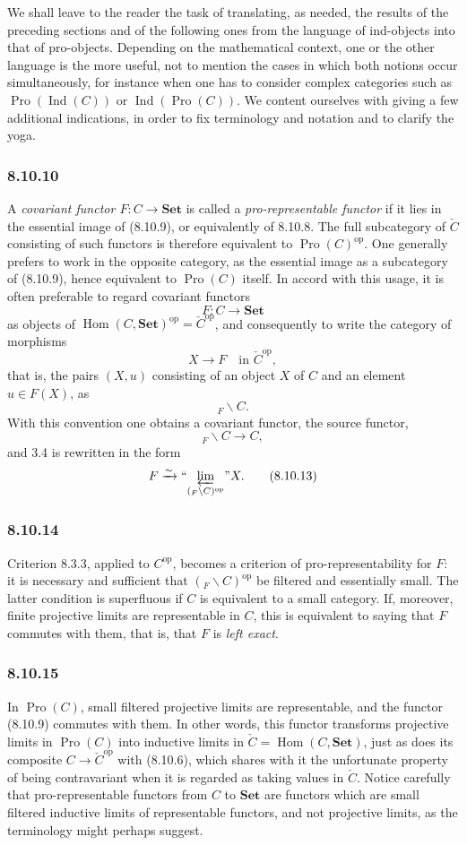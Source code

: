 \documentclass[11pt]{article}
\newcommand{\Set}{\mathbf{Set}}
\newcommand{\Ind}{\operatorname{Ind}}
\newcommand{\Pro}{\operatorname{Pro}}
\newcommand{\op}{\mathrm{op}}
\newcommand{\Hhom}{\operatorname{Hom}}
\newcommand{\prolimI}[1]{\textrm{``}\!\varprojlim_{#1}\!\textrm{''}}
\begin{document}
We shall leave to the reader the task of translating, as needed, the results of the preceding sections and of the following ones from the language of ind-objects into that of pro-objects. Depending on the mathematical context, one or the other language is the more useful, not to mention the cases in which both notions occur simultaneously, for instance when one has to consider complex categories such as $\Pro(\Ind(C))$ or $\Ind(\Pro(C))$. We content ourselves with giving a few additional indications, in order to fix terminology and notation and to clarify the yoga.

\subsubsection*{8.10.10}
A \emph{covariant functor $F:C\to\Set$} is called a \emph{pro-representable functor} if it lies in the essential image of (8.10.9), or equivalently of 8.10.8. The full subcategory of $\check C$ consisting of such functors is therefore equivalent to $\Pro(C)^\op$. One generally prefers to work in the opposite category, as the essential image as a subcategory of (8.10.9), hence equivalent to $\Pro(C)$ itself. In accord with this usage, it is often preferable to regard covariant functors
\[
 F:C\longrightarrow\Set
\]
as objects of $\Hhom(C,\Set)^\op=\check C^\op$, and consequently to write the category of morphisms
\[
 X\longrightarrow F\quad\text{in }\check C^\op,
\]
that is, the pairs $(X,u)$ consisting of an object $X$ of $C$ and an element $u\in F(X)$, as
\[
 {}_F\backslash C.
\tag{8.10.11}
\]
With this convention one obtains a covariant functor, the source functor,
\[
 {}_F\backslash C\longrightarrow C,
\tag{8.10.12}
\]
and 3.4 is rewritten in the form
\[
 F\xrightarrow{\sim}\prolimI{({}_F\backslash C)^\op}X.
\tag{8.10.13}
\]

\subsubsection*{8.10.14}
Criterion 8.3.3, applied to $C^\op$, becomes a criterion of pro-representability for $F$: it is necessary and sufficient that $({}_F\backslash C)^\op$ be filtered and essentially small. The latter condition is superfluous if $C$ is equivalent to a small category. If, moreover, finite projective limits are representable in $C$, this is equivalent to saying that $F$ commutes with them, that is, that $F$ is \emph{left exact}.

\subsubsection*{8.10.15}
In $\Pro(C)$, small filtered projective limits are representable, and the functor (8.10.9) commutes with them. In other words, this functor transforms projective limits in $\Pro(C)$ into inductive limits in $\check C=\Hhom(C,\Set)$, just as does its composite $C\to\check C^\op$ with (8.10.6), which shares with it the unfortunate property of being contravariant when it is regarded as taking values in $\check C$. Notice carefully that pro-representable functors from $C$ to $\Set$ are functors which are small filtered inductive limits of representable functors, and not projective limits, as the terminology might perhaps suggest.
\end{document}
